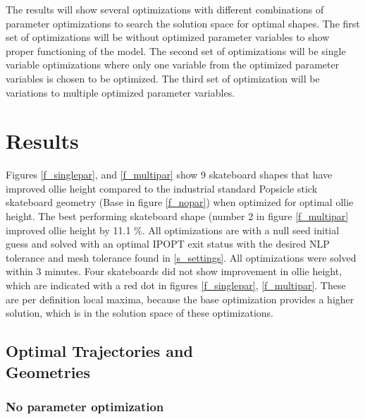 \documentclass[default,iicol]{sn-jnl}
\begin{document}
The results will show several optimizations with different combinations of parameter optimizations to search the solution space for optimal shapes. The first set of optimizations will be without optimized parameter variables to show proper functioning of the model. The second set of optimizations will be single variable optimizations where only one variable from the optimized parameter variables is chosen to be optimized. The third set of optimization will be variations to multiple optimized parameter variables. 

\section{Results}
Figures \ref{f_singlepar}, and \ref{f_multipar} show 9 skateboard shapes that have improved ollie height compared to the industrial standard Popsicle stick skateboard geometry (Base in figure \ref{f_nopar}) when optimized for optimal ollie height. The best performing skateboard shape (number 2 in figure \ref{f_multipar} improved ollie height by 11.1 \%. All optimizations are with a null seed initial guess and solved with an optimal IPOPT exit status with the desired NLP tolerance and mesh tolerance found in \ref{s_settings}. All optimizations were solved within 3 minutes. Four skateboards did not show improvement in ollie height, which are indicated with a red dot in figures \ref{f_singlepar}, \ref{f_multipar}. These are per definition local maxima, because the base optimization provides a higher solution, which is in the solution space of these optimizations. 

\subsection{Optimal Trajectories and \\Geometries}
\subsubsection{No parameter optimization}
\end{document}
